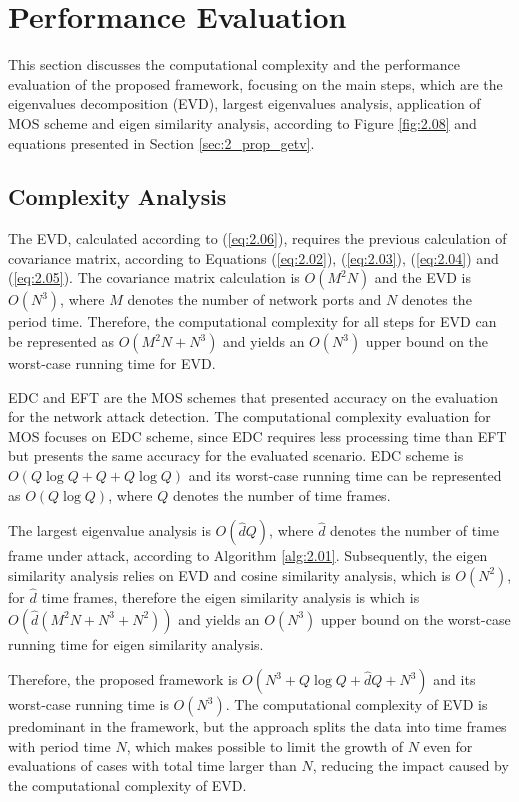 \section{Performance Evaluation}
\label{sec:2_Complexity}

This section discusses the computational complexity and the performance evaluation of the proposed framework, focusing on the main steps, which are the eigenvalues decomposition (EVD), largest eigenvalues analysis, application of MOS scheme and eigen similarity analysis, according to Figure \ref{fig:2.08} and equations presented in Section \ref{sec:2_prop_getv}.

\subsection{Complexity Analysis}
\label{sec:2_ComplexityAnalysis}
The EVD, calculated according to (\ref{eq:2.06}), requires the previous calculation of covariance matrix, according to Equations (\ref{eq:2.02}), (\ref{eq:2.03}), (\ref{eq:2.04}) and (\ref{eq:2.05}). The covariance matrix calculation is $O(M^2N)$ and the EVD is $O(N^3)$, where $M$ denotes the number of network ports and $N$ denotes the period time. Therefore, the computational complexity for all steps for EVD can be represented as $O(M^2N + N^3)$ and yields an $O(N^3)$ upper bound on the worst-case running time for EVD.

EDC and EFT are the MOS schemes that presented accuracy on the evaluation for the network attack detection. The computational complexity evaluation for MOS focuses on EDC scheme, since EDC requires less processing time than EFT but presents the same accuracy for the evaluated scenario. EDC scheme is $O(Q \log Q + Q + Q \log Q)$ and its worst-case running time can be represented as $O(Q \log Q)$, where $Q$ denotes the number of time frames.

The largest eigenvalue analysis is $O(\hat{d}Q)$, where $\hat{d}$ denotes the number of time frame under attack, according to Algorithm \ref{alg:2.01}. Subsequently, the eigen similarity analysis relies on EVD and cosine similarity analysis, which is $O(N^2)$, for $\hat{d}$ time frames, therefore the eigen similarity analysis is which is $O(\hat{d}(M^2N + N^3 + N^2))$ and yields an $O(N^3)$ upper bound on the worst-case running time for eigen similarity analysis.

Therefore, the proposed framework is $O(N^3 + Q \log Q + \hat{d}Q + N^3)$ and its worst-case running time is $O(N^3)$. The computational complexity of EVD is predominant in the framework, but the approach splits the data into time frames with period time $N$, which makes possible to limit the growth of $N$ even for evaluations of cases with total time larger than $N$, reducing the impact caused by the computational complexity of EVD.

